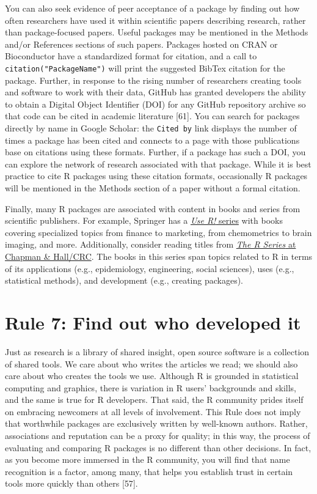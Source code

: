 \documentclass[10pt,letterpaper]{article}
\begin{document}
You can also seek evidence of peer acceptance of a package by finding
out how often researchers have used it within scientific papers
describing research, rather than package-focused papers. Useful packages
may be mentioned in the Methods and/or References sections of such
papers. Packages hosted on CRAN or Bioconductor have a standardized
format for citation, and a call to \texttt{citation("PackageName")} will
print the suggested BibTex citation for the package. Further, in
response to the rising number of researchers creating tools and software
to work with their data, GitHub has granted developers the ability to
obtain a Digital Object Identifier (DOI) for any GitHub repository
archive so that code can be cited in academic literature {[}61{]}. You
can search for packages directly by name in Google Scholar: the
\texttt{Cited\ by} link displays the number of times a package has been
cited and connects to a page with those publications base on citations
using these formats. Further, if a package has such a DOI, you can
explore the network of research associated with that package. While it
is best practice to cite R packages using these citation formats,
occasionally R packages will be mentioned in the Methods section of a
paper without a formal citation.

Finally, many R packages are associated with content in books and series
from scientific publishers. For example, Springer has a
\href{https://www.springer.com/series/6991}{\emph{Use R!} series} with
books covering specialized topics from finance to marketing, from
chemometrics to brain imaging, and more. Additionally, consider reading
titles from
\href{https://www.routledge.com/Chapman--HallCRC-The-R-Series/book-series/CRCTHERSER}{\emph{The
R Series} at Chapman \& Hall/CRC}. The books in this series span topics
related to R in terms of its applications (e.g., epidemiology,
engineering, social sciences), uses (e.g., statistical methods), and
development (e.g., creating packages).

\hypertarget{rule-7-find-out-who-developed-it}{%
\section{Rule 7: Find out who developed
it}\label{rule-7-find-out-who-developed-it}}

Just as research is a library of shared insight, open source software is
a collection of shared tools. We care about who writes the articles we
read; we should also care about who creates the tools we use. Although R
is grounded in statistical computing and graphics, there is variation in
R users' backgrounds and skills, and the same is true for R developers.
That said, the R community prides itself on embracing newcomers at all
levels of involvement. This Rule does not imply that worthwhile packages
are exclusively written by well-known authors. Rather, associations and
reputation can be a proxy for quality; in this way, the process of
evaluating and comparing R packages is no different than other
decisions. In fact, as you become more immersed in the R community, you
will find that name recognition is a factor, among many, that helps you
establish trust in certain tools more quickly than others {[}57{]}.
\end{document}
